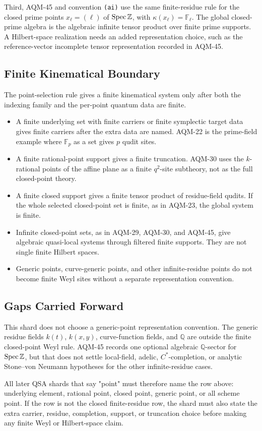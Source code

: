 Third, AQM-45 and convention \texttt{(ai)} use the same finite-residue rule
for the closed prime points \(x_\ell=(\ell)\) of \(\operatorname{Spec}\mathbb Z\), with
\(\kappa(x_\ell)=\mathbb F_\ell\).  The global closed-prime algebra is the
algebraic infinite tensor product over finite prime supports.  A Hilbert-space
realization needs an added representation choice, such as the
reference-vector incomplete tensor representation recorded in AQM-45.

\subsection{Finite Kinematical Boundary}

The point-selection rule gives a finite kinematical system only after both
the indexing family and the per-point quantum data are finite.

\begin{itemize}
\item A finite underlying set with finite carriers or finite symplectic target
data gives finite carriers after the extra data are named.  AQM-22 is the
prime-field example where \(\mathbb F_p\) as a set gives \(p\) qudit sites.
\item A finite rational-point support gives a finite truncation.  AQM-30 uses
the \(k\)-rational points of the affine plane as a finite \(q^2\)-site
subtheory, not as the full closed-point theory.
\item A finite closed support gives a finite tensor product of residue-field
qudits.  If the whole selected closed-point set is finite, as in AQM-23, the
global system is finite.
\item Infinite closed-point sets, as in AQM-29, AQM-30, and AQM-45, give
algebraic quasi-local systems through filtered finite supports.  They are
not single finite Hilbert spaces.
\item Generic points, curve-generic points, and other infinite-residue
points do not become finite Weyl sites without a separate representation
convention.
\end{itemize}

\subsection{Gaps Carried Forward}

This shard does not choose a generic-point representation convention.  The
generic residue fields \(k(t)\), \(k(x,y)\), curve-function fields, and
\(\mathbb Q\) are outside the finite closed-point Weyl rule.  AQM-45 records
one optional algebraic \(\mathbb Q\)-sector for \(\operatorname{Spec}\mathbb Z\), but that
does not settle local-field, adelic, \(C^*\)-completion, or analytic
Stone--von Neumann hypotheses for the other infinite-residue cases.

All later QSA shards that say "point" must therefore name the row above:
underlying element, rational point, closed point, generic point, or all scheme
point.  If the row is not the closed finite-residue row, the shard must also
state the extra carrier, residue, completion, support, or truncation choice
before making any finite Weyl or Hilbert-space claim.
